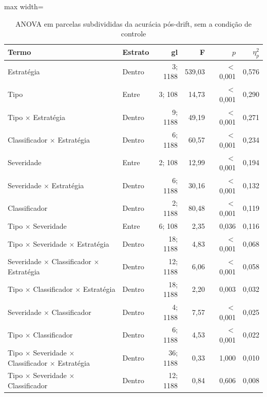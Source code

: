 \begin{table}[htbp]
\centering
\small
\caption{ANOVA em parcelas subdivididas da acurácia pós-drift, sem a condição de controle}
\label{tab:anova-sem-controle}
\begin{adjustbox}{max width=\textwidth}
\begin{tabular}{llrrrr}
\toprule
Termo & Estrato & gl & F & $p$ & $\eta^2_p$ \\
\midrule
Estratégia & Dentro & 3; 1188 & 539,03 & $<$ 0,001 & 0,576 \\
Tipo & Entre & 3; 108 & 14,73 & $<$ 0,001 & 0,290 \\
Tipo $\times$ Estratégia & Dentro & 9; 1188 & 49,19 & $<$ 0,001 & 0,271 \\
Classificador $\times$ Estratégia & Dentro & 6; 1188 & 60,57 & $<$ 0,001 & 0,234 \\
Severidade & Entre & 2; 108 & 12,99 & $<$ 0,001 & 0,194 \\
Severidade $\times$ Estratégia & Dentro & 6; 1188 & 30,16 & $<$ 0,001 & 0,132 \\
Classificador & Dentro & 2; 1188 & 80,48 & $<$ 0,001 & 0,119 \\
Tipo $\times$ Severidade & Entre & 6; 108 & 2,35 & 0,036 & 0,116 \\
Tipo $\times$ Severidade $\times$ Estratégia & Dentro & 18; 1188 & 4,83 & $<$ 0,001 & 0,068 \\
Severidade $\times$ Classificador $\times$ Estratégia & Dentro & 12; 1188 & 6,06 & $<$ 0,001 & 0,058 \\
Tipo $\times$ Classificador $\times$ Estratégia & Dentro & 18; 1188 & 2,20 & 0,003 & 0,032 \\
Severidade $\times$ Classificador & Dentro & 4; 1188 & 7,57 & $<$ 0,001 & 0,025 \\
Tipo $\times$ Classificador & Dentro & 6; 1188 & 4,53 & $<$ 0,001 & 0,022 \\
Tipo $\times$ Severidade $\times$ Classificador $\times$ Estratégia & Dentro & 36; 1188 & 0,33 & 1,000 & 0,010 \\
Tipo $\times$ Severidade $\times$ Classificador & Dentro & 12; 1188 & 0,84 & 0,606 & 0,008 \\
\bottomrule
\end{tabular}
\end{adjustbox}
\par{}
\end{table}
